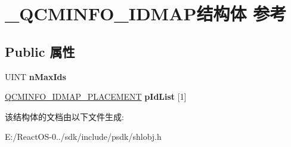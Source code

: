 \hypertarget{struct___q_c_m_i_n_f_o___i_d_m_a_p}{}\section{\+\_\+\+Q\+C\+M\+I\+N\+F\+O\+\_\+\+I\+D\+M\+A\+P结构体 参考}
\label{struct___q_c_m_i_n_f_o___i_d_m_a_p}
\subsection*{Public 属性}
\begin{DoxyCompactItemize}
\item 
\mbox{\label{struct___q_c_m_i_n_f_o___i_d_m_a_p_a46dabbb7212735f5a3a23483960676a8}} 
U\+I\+NT {\bfseries n\+Max\+Ids}
\item 
\mbox{\label{struct___q_c_m_i_n_f_o___i_d_m_a_p_a8b01d43e547c0c1fa7f623e6fd802338}} 
\hyperlink{struct___q_c_m_i_n_f_o___i_d_m_a_p___p_l_a_c_e_m_e_n_t}{Q\+C\+M\+I\+N\+F\+O\+\_\+\+I\+D\+M\+A\+P\+\_\+\+P\+L\+A\+C\+E\+M\+E\+NT} {\bfseries p\+Id\+List} \mbox{[}1\mbox{]}
\end{DoxyCompactItemize}


该结构体的文档由以下文件生成\+:\begin{DoxyCompactItemize}
\item 
E\+:/\+React\+O\+S-\/0../sdk/include/psdk/shlobj.\+h\end{DoxyCompactItemize}
